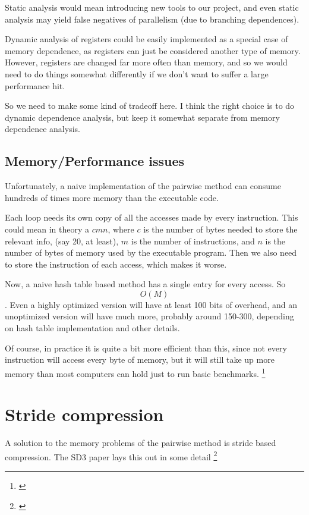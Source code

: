 \documentclass[12pt,twoside]{reedthesis}
\begin{document}
		Static analysis would mean introducing new tools to our project, and even static analysis may yield false negatives of parallelism (due to branching dependences).

		Dynamic analysis of registers could be easily implemented as a special case of memory dependence, as registers can just be considered another type of memory. However, registers are changed far more often than memory, and so we would need to do things somewhat differently if we don't want to suffer a large performance hit.

		So we need to make some kind of tradeoff here. I think the right choice is to do dynamic dependence analysis, but keep it somewhat separate from memory dependence analysis.


		\subsection{Memory/Performance issues}

		Unfortunately, a naive implementation of the pairwise method can consume hundreds of times more memory than the executable code.

		Each loop needs its own copy of all the accesses made by every instruction. This could mean in theory a $cmn$, where $c$ is the number of bytes needed to store the relevant info, (say 20, at least), $m$ is the number of instructions, and $n$ is the number of bytes of memory used by the executable program. Then we also need to store the instruction of each access, which makes it worse.
		
		Now, a naive hash table based method has a single entry for every access. 
		So $$O(M)$$. Even a highly optimized version will have at least 100 bits of overhead, and an unoptimized version will have much more, probably around 150-300, depending on hash table implementation and other details. 

		Of course, in practice it is quite a bit more efficient than this, since not every instruction will access every byte of memory, but it will still take up more memory than most computers can hold just to run basic benchmarks. \footnote{\cite{Kim:2010}}

	\section{Stride compression}

		A solution to the memory problems of the pairwise method is stride based compression. The SD3 paper lays this out in some detail \footnote{\cite{Kim:2010}}
\end{document}
